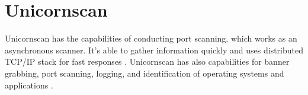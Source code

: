 \section{Unicornscan}
\label{s:HowUnicornscanWorks}
Unicornscan has the capabilities of conducting port scanning, which works as an asynchronous scanner. It's able to gather information quickly and uses distributed TCP/IP stack for fast responses \autocite{hoque2014network}. Unicornscan has also capabilities for banner grabbing, port scanning, logging, and identification of operating systems and applications \autocite{UnicornScan}.